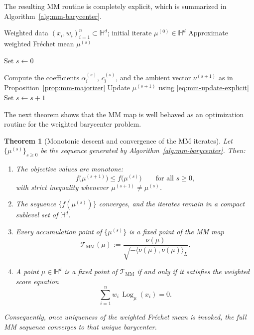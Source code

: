 \documentclass[11pt]{article}
\newtheorem{theorem}{Theorem}[section]
\begin{document}
The resulting MM routine is completely explicit, which is summarized in Algorithm~\ref{alg:mm-barycenter}.
\begin{algorithm}[t]
\caption{MM update for the weighted hyperbolic Fr\'echet mean}
\label{alg:mm-barycenter}
\begin{algorithmic}[1]
\REQUIRE Weighted data \((x_i,w_i)_{i=1}^n\subset \mathbb{H}^d\); initial iterate \(\mu^{(0)}\in\mathbb{H}^d\)
\ENSURE Approximate weighted Fr\'echet mean \(\mu^{(s)}\)

\STATE Set \(s\gets 0\)

    \STATE Compute the coefficients \(\alpha_i^{(s)}\), \(c_i^{(s)}\), and the ambient vector \(\nu^{(s+1)}\) as in Proposition~\ref{prop:mm-majorizer}
    \STATE Update \(\mu^{(s+1)}\) using \eqref{eq:mm-update-explicit}
    \STATE Set \(s\gets s+1\)
\ENDWHILE

\end{algorithmic}
\end{algorithm}

The next theorem shows that the MM map is well behaved as an optimization routine for the weighted barycenter problem.

\begin{theorem}[Monotonic descent and convergence of the MM iterates]\label{thm:mm-convergence}
Let \(\{\mu^{(s)}\}_{s\ge 0}\) be the sequence generated by Algorithm~\ref{alg:mm-barycenter}. Then:
\begin{enumerate}[label=(\roman*)]
    \item The objective values are monotone:
    \begin{equation}\label{eq:mm-descent}
    f\bigl(\mu^{(s+1)}\bigr)\le f\bigl(\mu^{(s)}\bigr)
    \qquad\text{for all }s\ge 0,
    \end{equation}
    with strict inequality whenever \(\mu^{(s+1)}\neq \mu^{(s)}\).
    \item The sequence \(\{f(\mu^{(s)})\}\) converges, and the iterates remain in a compact sublevel set of \(\mathbb{H}^d\).
    \item Every accumulation point of \(\{\mu^{(s)}\}\) is a fixed point of the MM map
    \begin{equation}\label{eq:mm-map-def}
    \mathcal{T}_{\mathrm{MM}}(\mu)
    :=
    \frac{\nu(\mu)}{\sqrt{-\langle \nu(\mu),\nu(\mu)\rangle_L}}.
    \end{equation}
    \item A point \(\mu\in\mathbb{H}^d\) is a fixed point of \(\mathcal{T}_{\mathrm{MM}}\) if and only if it satisfies the weighted score equation
    \begin{equation}\label{eq:mm-fixedpoint-score}
    \sum_{i=1}^n w_i\,\operatorname{Log}_\mu(x_i)=0.
    \end{equation}
\end{enumerate}
Consequently, once uniqueness of the weighted Fr\'echet mean is invoked, the full MM sequence converges to that unique barycenter.
\end{theorem}
\end{document}
